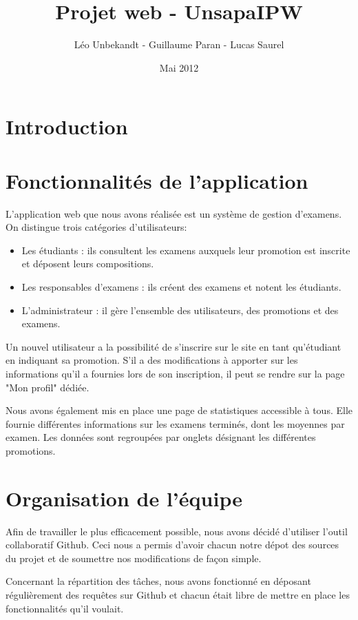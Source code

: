 \documentclass{report}
\author{Léo Unbekandt - Guillaume Paran - Lucas Saurel}
\date{Mai 2012}
\title{Projet web - UnsapaIPW}
\begin{document}
  \maketitle
  \tableofcontents

  \section*{Introduction}

  \section{Fonctionnalités de l'application}
  L'application web que nous avons réalisée est un système de gestion d'examens. On distingue trois catégories d'utilisateurs:
  \begin{itemize}
        \item{Les étudiants : ils consultent les examens auxquels leur promotion est inscrite et déposent leurs compositions.}
        \item{Les responsables d'examens : ils créent des examens et notent les étudiants.}
        \item{L'administrateur : il gère l'ensemble des utilisateurs, des promotions et des examens.}
      \end{itemize}

    Un nouvel utilisateur a la possibilité de s'inscrire sur le site en tant qu'étudiant en indiquant sa promotion. S'il a des modifications à apporter sur les informations qu'il a fournies lors de son inscription, il peut se rendre sur la page "Mon profil" dédiée.
    
    Nous avons également mis en place une page de statistiques accessible à tous. Elle fournie différentes informations sur les examens terminés, dont les moyennes par examen. Les données sont regroupées par onglets désignant les différentes promotions.
  
  \section{Organisation de l'équipe}
  	Afin de travailler le plus efficacement possible, nous avons décidé d'utiliser l'outil collaboratif Github. Ceci nous a permis d'avoir chacun notre dépot des sources du projet et de soumettre nos modifications de façon simple.
  	
  	Concernant la répartition des tâches, nous avons fonctionné en déposant régulièrement des requêtes sur Github et chacun était libre de mettre en place les fonctionnalités qu'il voulait.
  	
\end{document}
